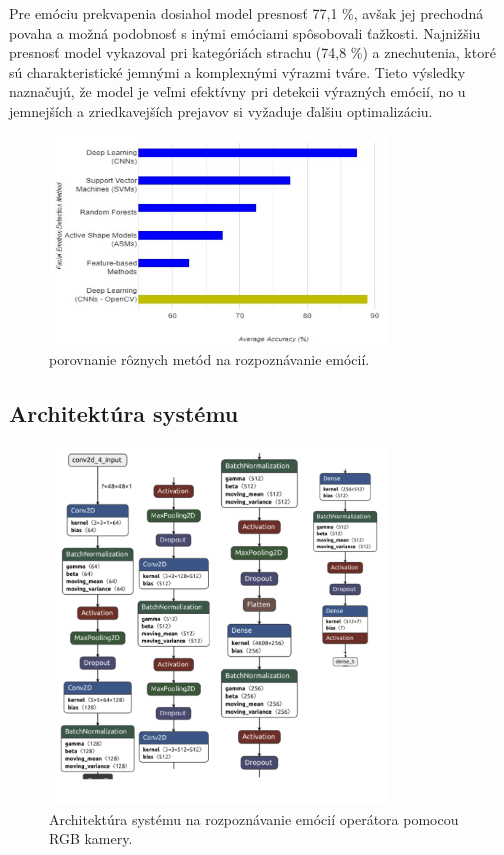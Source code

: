 Pre emóciu prekvapenia dosiahol model presnosť 77,1 \%, avšak jej prechodná povaha a možná podobnosť s inými emóciami spôsobovali ťažkosti. Najnižšiu presnosť 
model vykazoval pri kategóriách strachu (74,8 \%) a znechutenia, ktoré sú charakteristické jemnými a komplexnými výrazmi tváre. Tieto výsledky naznačujú,
že model je veľmi efektívny pri detekcii výrazných emócií, no u jemnejších a zriedkavejších prejavov si vyžaduje ďalšiu optimalizáciu. \cite{inProceedings02}
\begin{figure}[!htpb]
    \centering
    \includegraphics[width=0.8\textwidth]{img/comparation.png}
    \caption{porovnanie rôznych metód na rozpoznávanie emócií. \cite{inProceedings02}}
    \label{fig:comparation}
\end{figure}
\newpage
\subsection{Architektúra systému}
\begin{figure}[!htpb]
    \centering
    \includegraphics[width=0.8\textwidth]{img/architecture.png}
    \caption{Architektúra systému na rozpoznávanie emócií operátora pomocou RGB kamery.} 
    \label{fig:architecture}
\end{figure}
\newpage

